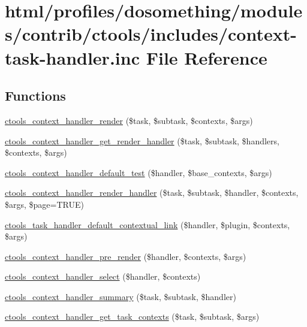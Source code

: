 \hypertarget{context-task-handler_8inc}{
\section{html/profiles/dosomething/modules/contrib/ctools/includes/context-\/task-\/handler.inc File Reference}
\label{context-task-handler_8inc}
}
\subsection*{Functions}
\begin{DoxyCompactItemize}
\item 
\hyperlink{context-task-handler_8inc_ab312cb431a0ff2c79ef6070eb45d339f}{ctools\_\-context\_\-handler\_\-render} (\$task, \$subtask, \$contexts, \$args)
\item 
\hyperlink{context-task-handler_8inc_a681a1468d47bbb2b97137fe724006f30}{ctools\_\-context\_\-handler\_\-get\_\-render\_\-handler} (\$task, \$subtask, \$handlers, \$contexts, \$args)
\item 
\hyperlink{context-task-handler_8inc_a4cc12d46b27a1b4329443095581da43a}{ctools\_\-context\_\-handler\_\-default\_\-test} (\$handler, \$base\_\-contexts, \$args)
\item 
\hyperlink{context-task-handler_8inc_a75643365ecd521559adca3889dd5ce64}{ctools\_\-context\_\-handler\_\-render\_\-handler} (\$task, \$subtask, \$handler, \$contexts, \$args, \$page=TRUE)
\item 
\hyperlink{context-task-handler_8inc_a4edcfd0731cd41013df2abcd6c63b0c4}{ctools\_\-task\_\-handler\_\-default\_\-contextual\_\-link} (\$handler, \$plugin, \$contexts, \$args)
\item 
\hyperlink{context-task-handler_8inc_ae623bc36eda278a79508f16d2fb4b867}{ctools\_\-context\_\-handler\_\-pre\_\-render} (\$handler, \$contexts, \$args)
\item 
\hyperlink{context-task-handler_8inc_a8fe40e14c624ef707817204ece36295d}{ctools\_\-context\_\-handler\_\-select} (\$handler, \$contexts)
\item 
\hyperlink{context-task-handler_8inc_a7a818e1d2416fc379abef23b7861541a}{ctools\_\-context\_\-handler\_\-summary} (\$task, \$subtask, \$handler)
\item 
\hyperlink{context-task-handler_8inc_a3c1fa47c9e759dccffdb132a41d7f40f}{ctools\_\-context\_\-handler\_\-get\_\-task\_\-contexts} (\$task, \$subtask, \$args)

\end{DoxyCompactItemize}
